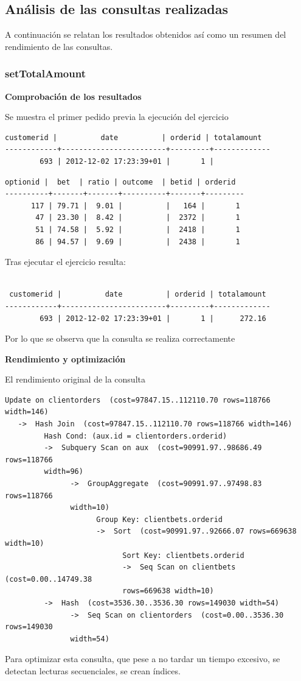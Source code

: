 \documentclass{article}
\begin{document}
\subsection{Análisis de las consultas realizadas}
A continuación se relatan los resultados obtenidos así como un resumen del rendimiento de las consultas.
\subsubsection{setTotalAmount}

\textbf{Comprobación de los resultados}

Se muestra el primer pedido previa la ejecución del ejercicio
\lstset{basicstyle=\small,style=sql}
\begin{lstlisting}[style=sql]
 customerid |          date          | orderid | totalamount
------------+------------------------+---------+-------------
        693 | 2012-12-02 17:23:39+01 |       1 |
\end{lstlisting}
\begin{lstlisting}[style=sql]
 optionid |  bet  | ratio | outcome  | betid | orderid
----------+-------+-------+----------+-------+---------
      117 | 79.71 |  9.01 |          |   164 |       1
       47 | 23.30 |  8.42 |          |  2372 |       1
       51 | 74.58 |  5.92 |          |  2418 |       1
       86 | 94.57 |  9.69 |          |  2438 |       1
\end{lstlisting} 
Tras ejecutar el ejercicio resulta:
\begin{lstlisting}[style=sql]

 customerid |          date          | orderid | totalamount
------------+------------------------+---------+-------------
        693 | 2012-12-02 17:23:39+01 |       1 |      272.16
\end{lstlisting}
Por lo que se observa que la consulta se realiza correctamente
$$\;$$

\textbf{Rendimiento y optimización}

El rendimiento original de la consulta
\lstset{basicstyle=\small,style=sql}
\begin{lstlisting}[style=sql]
 Update on clientorders  (cost=97847.15..112110.70 rows=118766 width=146)
   ->  Hash Join  (cost=97847.15..112110.70 rows=118766 width=146)
         Hash Cond: (aux.id = clientorders.orderid)
         ->  Subquery Scan on aux  (cost=90991.97..98686.49 rows=118766 
         width=96)
               ->  GroupAggregate  (cost=90991.97..97498.83 rows=118766 
               width=10)
                     Group Key: clientbets.orderid
                     ->  Sort  (cost=90991.97..92666.07 rows=669638 width=10)
                           Sort Key: clientbets.orderid
                           ->  Seq Scan on clientbets  (cost=0.00..14749.38 
                           rows=669638 width=10)
         ->  Hash  (cost=3536.30..3536.30 rows=149030 width=54)
               ->  Seq Scan on clientorders  (cost=0.00..3536.30 rows=149030 
               width=54)

\end{lstlisting}
Para optimizar esta consulta, que pese a no tardar un tiempo excesivo, se detectan lecturas secuenciales, se crean índices.
\end{document}

